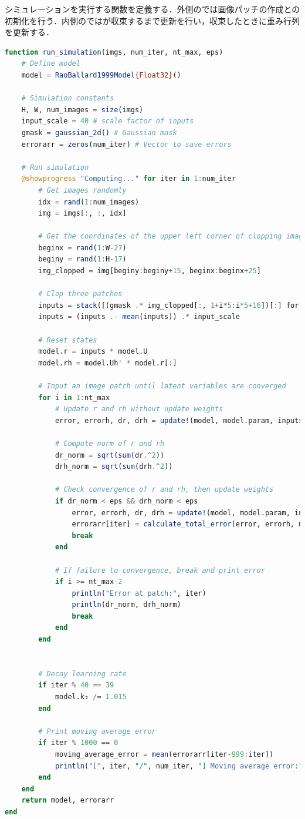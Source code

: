 シミュレーションを実行する関数を定義する．外側のでは画像パッチの作成との初期化を行う．内側のではが収束するまで更新を行い，収束したときに重み行列を更新する．
\begin{lstlisting}[language=julia]
function run_simulation(imgs, num_iter, nt_max, eps)
    # Define model
    model = RaoBallard1999Model{Float32}()
    
    # Simulation constants
    H, W, num_images = size(imgs)
    input_scale = 40 # scale factor of inputs
    gmask = gaussian_2d() # Gaussian mask
    errorarr = zeros(num_iter) # Vector to save errors    
    
    # Run simulation
    @showprogress "Computing..." for iter in 1:num_iter
        # Get images randomly
        idx = rand(1:num_images)
        img = imgs[:, :, idx]

        # Get the coordinates of the upper left corner of clopping image randomly.
        beginx = rand(1:W-27)
        beginy = rand(1:H-17)
        img_clopped = img[beginy:beginy+15, beginx:beginx+25]

        # Clop three patches
        inputs = stack([(gmask .* img_clopped[:, 1+i*5:i*5+16])[:] for i = 0:2])'
        inputs = (inputs .- mean(inputs)) .* input_scale

        # Reset states
        model.r = inputs * model.U 
        model.rh = model.Uh' * model.r[:]

        # Input an image patch until latent variables are converged 
        for i in 1:nt_max
            # Update r and rh without update weights 
            error, errorh, dr, drh = update!(model, model.param, inputs, false)

            # Compute norm of r and rh
            dr_norm = sqrt(sum(dr.^2))
            drh_norm = sqrt(sum(drh.^2))

            # Check convergence of r and rh, then update weights
            if dr_norm < eps && drh_norm < eps
                error, errorh, dr, drh = update!(model, model.param, inputs, true)
                errorarr[iter] = calculate_total_error(error, errorh, model, model.param) # Append errors
                break
            end

            # If failure to convergence, break and print error
            if i >= nt_max-2
                println("Error at patch:", iter)
                println(dr_norm, drh_norm)
                break
            end
        end


        # Decay learning rate         
        if iter % 40 == 39
            model.k₂ /= 1.015
        end

        # Print moving average error
        if iter % 1000 == 0
            moving_average_error = mean(errorarr[iter-999:iter])
            println("[", iter, "/", num_iter, "] Moving average error:", moving_average_error)
        end
    end
    return model, errorarr
end
\end{lstlisting}
